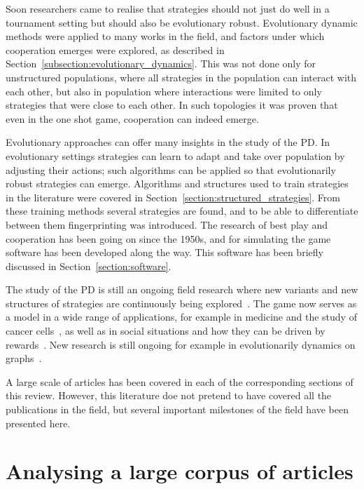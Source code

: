 \documentclass{article}
\theoremstyle{definition}
\begin{document}
Soon researchers came to realise that strategies should not just do well in a tournament setting
but should also be evolutionary robust. Evolutionary dynamic methods were
applied to many works in the field, and factors under which cooperation
emerges were explored, as described in Section~\ref{subsection:evolutionary_dynamics}.
This was not done only for unstructured populations, where all strategies
in the population can interact with each other, but also in population where
interactions were limited to only strategies that were close to each other.
In such topologies it was proven that even in the one shot game, cooperation can
indeed emerge.

Evolutionary approaches can offer many insights in the study of the PD. In
evolutionary settings strategies can learn to adapt and take over population by
adjusting their actions; such algorithms can be applied so that evolutionarily
robust strategies can emerge. Algorithms and structures used to train strategies
in the literature were covered in Section~\ref{section:structured_strategies}.
From these training methods several strategies are found,
and to be able to differentiate between them fingerprinting was
introduced. The research of best play and cooperation has been going on since
the 1950s, and for simulating the game software has been developed along the
way. This software has been briefly discussed
in Section~\ref{section:software}.

The study of the PD is still an ongoing field research where new variants and
new structures of strategies are
continuously being explored~\cite{Ohtsuki2018}. The game now serves as a model
in a wide range of applications, for example in medicine and the study of cancer
cells~\cite{archetti2018, Kaznatchee2017}, as well as in social situations and
how they can be driven by rewards~\cite{Dridi2018}. New research is still ongoing
for example in evolutionarily dynamics on graphs~\cite{Allen2017, hathcock2018,
Liu2017}.

A large scale of articles has been covered in each of the corresponding sections
of this review. However, this literature doe not pretend to have covered all the
publications in the field, but several important milestones of the field have
been presented here.

\section{Analysing a large corpus of articles}\label{section:analysis}
\end{document}
